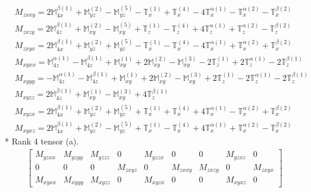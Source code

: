 \documentclass[fleqn,8pt,landscape]{jsarticle}
\begin{document}
\begin{align*}
& M_{zxxy} = 2 \mathbb{M}_{4x}^{\beta(1)} + \mathbb{M}_{yz}^{(2)} - \mathbb{M}_{yz}^{(5)} - \mathbb{T}_{x}^{(1)} + \mathbb{T}_{x}^{(4)} - 4 \mathbb{T}_{x}^{\alpha(1)} - \mathbb{T}_{x}^{\alpha(2)} - \mathbb{T}_{x}^{\beta(2)} \\
& M_{zxzy} = 2 \mathbb{M}_{4z}^{\beta(1)} + \mathbb{M}_{xy}^{(2)} - \mathbb{M}_{xy}^{(5)} + \mathbb{T}_{z}^{(1)} - \mathbb{T}_{z}^{(4)} + 4 \mathbb{T}_{z}^{\alpha(1)} + \mathbb{T}_{z}^{\alpha(2)} - \mathbb{T}_{z}^{\beta(2)} \\
& M_{zxyx} = 2 \mathbb{M}_{4x}^{\beta(1)} + \mathbb{M}_{yz}^{(2)} + \mathbb{M}_{yz}^{(5)} - \mathbb{T}_{x}^{(1)} - \mathbb{T}_{x}^{(4)} - 4 \mathbb{T}_{x}^{\alpha(1)} + \mathbb{T}_{x}^{\alpha(2)} + \mathbb{T}_{x}^{\beta(2)} \\
& M_{xyxx} = \mathbb{M}_{4z}^{\alpha(1)} - \mathbb{M}_{4z}^{\beta(1)} + \mathbb{M}_{xy}^{(1)} + 2 \mathbb{M}_{xy}^{(2)} - \mathbb{M}_{xy}^{(3)} - 2 \mathbb{T}_{z}^{(1)} + 2 \mathbb{T}_{z}^{\alpha(1)} - 2 \mathbb{T}_{z}^{\beta(1)} \\
& M_{xyyy} = - \mathbb{M}_{4z}^{\alpha(1)} - \mathbb{M}_{4z}^{\beta(1)} + \mathbb{M}_{xy}^{(1)} + 2 \mathbb{M}_{xy}^{(2)} - \mathbb{M}_{xy}^{(3)} + 2 \mathbb{T}_{z}^{(1)} - 2 \mathbb{T}_{z}^{\alpha(1)} - 2 \mathbb{T}_{z}^{\beta(1)} \\
& M_{xyzz} = 2 \mathbb{M}_{4z}^{\beta(1)} + \mathbb{M}_{xy}^{(1)} - \mathbb{M}_{xy}^{(3)} + 4 \mathbb{T}_{z}^{\beta(1)} \\
& M_{xyzx} = 2 \mathbb{M}_{4x}^{\beta(1)} + \mathbb{M}_{yz}^{(2)} + \mathbb{M}_{yz}^{(5)} + \mathbb{T}_{x}^{(1)} + \mathbb{T}_{x}^{(4)} + 4 \mathbb{T}_{x}^{\alpha(1)} - \mathbb{T}_{x}^{\alpha(2)} + \mathbb{T}_{x}^{\beta(2)} \\
& M_{xyxz} = 2 \mathbb{M}_{4x}^{\beta(1)} + \mathbb{M}_{yz}^{(2)} - \mathbb{M}_{yz}^{(5)} + \mathbb{T}_{x}^{(1)} - \mathbb{T}_{x}^{(4)} + 4 \mathbb{T}_{x}^{\alpha(1)} + \mathbb{T}_{x}^{\alpha(2)} - \mathbb{T}_{x}^{\beta(2)}
\end{align*}
* Rank 4 tensor (a).
\begin{align*}
\begin{bmatrix} M_{yzxx} & M_{yzyy} & M_{yzzz} & 0 & M_{yzzx} & 0 & 0 & M_{yzxz} & 0 \\ 0 & 0 & 0 & M_{zxyz} & 0 & M_{zxxy} & M_{zxzy} & 0 & M_{zxyx} \\ M_{xyxx} & M_{xyyy} & M_{xyzz} & 0 & M_{xyzx} & 0 & 0 & M_{xyxz} & 0 \end{bmatrix}
\end{align*}
\end{document}
